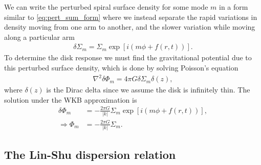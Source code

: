 We can write the perturbed spiral surface density for some mode $m$ in a form similar to \eqref{eq:pert_sum_form} where we instead separate the rapid variations in density moving from one arm to another, and the slower variation while moving along a particular arm
\begin{align}
    \delta \Sigma_m = \Sigma_m \exp \left[ i \left( m \phi + f(r,t)  \right)  \right]. \label{eq:sigma_WKB}
\end{align}
To determine the disk response we must find the gravitational potential due to this perturbed surface density, which is done by solving Poisson's equation
\begin{align}
    \nabla^2 \delta \Phi_m = 4 \pi G \delta \Sigma_m \delta(z), \label{eq:poisson_pert}
\end{align}
where $\delta(z)$ is the Dirac delta since we assume the disk is infinitely thin. 
The solution under the WKB approximation is \citep[e.g.][]{binney2008}
\begin{align}
    \delta \Phi_m &= - \frac{2 \pi G}{|k|} \Sigma_m \exp \left[ i \left( m \phi + f(r,t)  \right)  \right], \\
    \Rightarrow \Phi_m &= - \frac{2 \pi G}{|k|} \Sigma_m. \label{eq:phi_m_sigma_m}
\end{align}

\subsection{The Lin-Shu dispersion relation} \label{sec:linshu}


